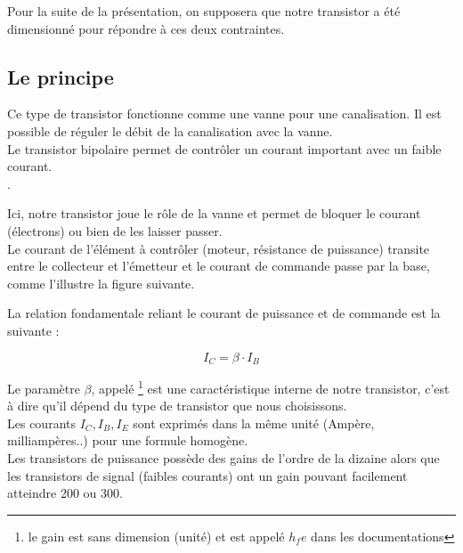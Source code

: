 {Pour la suite de la présentation, on supposera que notre transistor a été dimensionné pour répondre à ces deux contraintes.


\subsection{Le principe}

Ce type de transistor fonctionne comme une vanne pour une canalisation. Il est possible de réguler le débit de la canalisation avec la vanne.\\

Le transistor bipolaire permet de contrôler un courant important avec un faible courant.\\

.

Ici, notre transistor joue le rôle de la vanne et permet de bloquer le courant (électrons) ou bien de les laisser passer. \\


Le courant de l'élément à contrôler (moteur, résistance de puissance) transite entre le collecteur et l'émetteur et le courant de commande passe par la base, comme l'illustre la figure suivante.\\


La relation fondamentale reliant le courant de puissance et de commande est la suivante : 

$$ \boxed{ I_{C} = \beta \cdot I_{B} }$$

Le paramètre $\beta$, appelé \footnote{le gain est sans dimension (unité) et est appelé $ h_fe$ dans les documentations} est une caractéristique interne de notre transistor, c'est à dire qu'il dépend du type de transistor que nous choisissons.\\
Les courants $I_{C}, I_{B},I_{E}$ sont exprimés dans la même unité (Ampère, milliampères..) pour une formule homogène.\\

Les transistors de puissance possède des gains de l'ordre de la dizaine alors que les transistors de signal (faibles courants) ont un gain pouvant facilement atteindre 200 ou 300.


}
